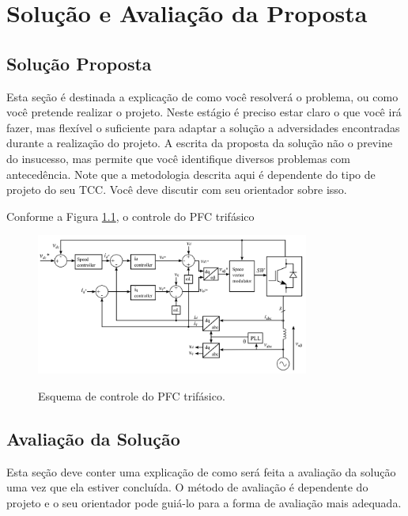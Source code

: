 \chapter{Solução e Avaliação da Proposta}
\section{Solução Proposta}
Esta seção é destinada a explicação de como você resolverá o problema, ou como você pretende
realizar o projeto. Neste estágio é preciso estar claro o que você irá fazer, mas flexível o
suficiente para adaptar a solução a adversidades encontradas durante a realização do projeto. A
escrita da proposta da solução não o previne do insucesso, mas permite que você identifique
diversos problemas com antecedência. Note que a metodologia descrita aqui é dependente do tipo
de projeto do seu TCC. Você deve discutir com seu orientador sobre isso.

Conforme a Figura \ref{fig:controlepfc3ph}, o controle do PFC trifásico

\begin{figure}
    \centering
    \caption{Esquema de controle do PFC trifásico.}
    \includegraphics[width=0.8\textwidth]{./Figuras/controlepfc3ph.png}
    \label{fig:controlepfc3ph}
\end{figure}

\section{Avaliação da Solução}
Esta seção deve conter uma explicação de como será feita a avaliação da solução uma vez que ela
estiver concluída. O método de avaliação é dependente do projeto e o seu orientador pode
guiá-lo para a forma de avaliação mais adequada.
